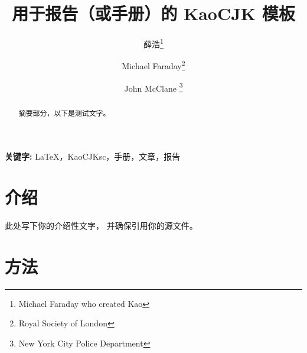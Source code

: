 \documentclass[
]{styles/kaohandtCJKsc}
\begin{document}



\title[用于报告（或手册）的 KaoCJK 模板]{用于报告（或手册）的 KaoCJK 模板}

\author[MX, MF, JMC]{薛浩\thanks{Michael Faraday who created Kao} \and Michael Faraday\thanks{Royal Society of London} \and John McClane \thanks{New York City Police Department}}

\date{\zhtoday}


\maketitle

\margintoc

\begin{abstract}
\noindent
摘要部分，以下是测试文字。\blindtext
\end{abstract}

{\noindent\textbf{关键字:} \LaTeX，KaoCJKsc，手册，文章，报告}

\medskip


\section{介绍}

此处写下你的介绍性文字， 并确保引用你的源文件。

\blindtext{}

\section{方法}
\end{document}
